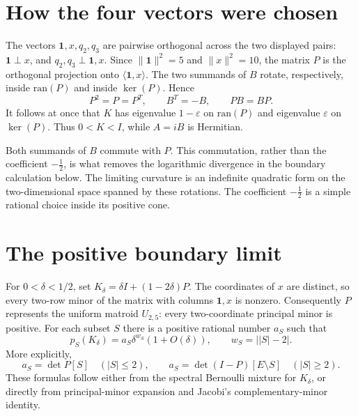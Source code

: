 \documentclass[11pt]{article}
\newcommand{\one}{\mathbf 1}
\begin{document}
\section{How the four vectors were chosen}

The vectors \(\one,x,q_2,q_3\) are pairwise orthogonal across the two displayed
pairs: \(\one\perp x\), and \(q_2,q_3\perp\one,x\).  Since
\(\|\one\|^2=5\) and \(\|x\|^2=10\), the matrix \(P\) is the orthogonal
projection onto \(\langle\one,x\rangle\).  The two summands of \(B\) rotate,
respectively, inside \(\mathrm{ran}(P)\) and inside \(\ker(P)\).  Hence
\begin{equation}\label{eq:commute}
 P^2=P=P^T,\qquad B^T=-B,\qquad PB=BP.
\end{equation}
It follows at once that \(K\) has eigenvalue \(1-\varepsilon\) on
\(\mathrm{ran}(P)\) and eigenvalue \(\varepsilon\) on \(\ker(P)\).  Thus
\(0<K<I\), while \(A=iB\) is Hermitian.

Both summands of \(B\) commute with \(P\).  This commutation, rather than the
coefficient \(-\tfrac12\), is what removes the logarithmic divergence in the
boundary calculation below.  The limiting curvature is an indefinite quadratic
form on the two-dimensional space spanned by these rotations.  The coefficient
\(-\tfrac12\) is a simple rational choice inside its positive cone.

\section{The positive boundary limit}

For \(0<\delta<1/2\), set
\(K_\delta=\delta I+(1-2\delta)P\).  The coordinates of \(x\) are distinct,
so every two-row minor of the matrix with columns \(\one,x\) is nonzero.
Consequently \(P\) represents the uniform matroid \(U_{2,5}\): every
two-coordinate principal minor is positive.  For each subset \(S\) there is a
positive rational number \(a_S\) such that
\begin{equation}\label{eq:asymptotic}
 p_S(K_\delta)=a_S\delta^{w_S}(1+O(\delta)),
 \qquad w_S=\bigl||S|-2\bigr|.
\end{equation}
More explicitly,
\[
 a_S=\det P[S]\quad(|S|\le2),
 \qquad
 a_S=\det(I-P)[E\setminus S]\quad(|S|\ge2).
\]
These formulas follow either from the spectral Bernoulli mixture for
\(K_\delta\), or directly from principal-minor expansion and Jacobi's
complementary-minor identity.
\end{document}
